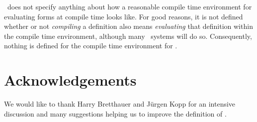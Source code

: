 \CL\ does not specify anything about how a reasonable compile time
environment for evaluating forms at compile time looks like. For good
reasons, it is not defined whether or not {\em compiling} a definition
also means {\em evaluating} that definition within the compile time
environment, although many \CL\ systems will do so. Consequently,
nothing is defined for the compile time environment for .






\section{}
\label{clos0def}



\section{Acknowledgements}

We would like to thank Harry Bretthauer and J\"urgen Kopp for an intensive 
discussion and many suggestions helping us to improve the definition of 
.

\nocite{APPLY/GMD/XIII/1}
\nocite{Knutzen91}
\nocite{Burkart91}
 



